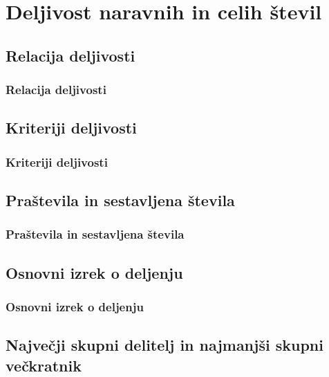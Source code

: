 \section{Deljivost naravnih in celih števil}

\begin{frame}
    \sectionpage
\end{frame}

\begin{frame}
\end{frame}

    \subsection{Relacija deljivosti}

        \begin{frame}
            \frametitle{Relacija deljivosti}
        \end{frame}

    \subsection{Kriteriji deljivosti}

        \begin{frame}
            \frametitle{Kriteriji deljivosti}
        \end{frame}

    \subsection{Praštevila in sestavljena števila}

        \begin{frame}
            \frametitle{Praštevila in sestavljena števila}
        \end{frame}

    \subsection{Osnovni izrek o deljenju}

        \begin{frame}
            \frametitle{Osnovni izrek o deljenju}
        \end{frame}

    \subsection{Največji skupni delitelj in najmanjši skupni večkratnik}


